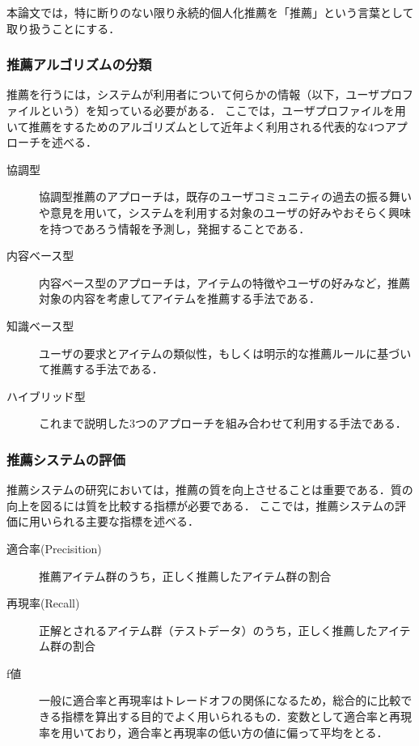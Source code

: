 \documentclass{jsarticle}
\begin{document}
本論文では，特に断りのない限り永続的個人化推薦を「推薦」という言葉として取り扱うことにする．

\subsubsection{推薦アルゴリズムの分類}

推薦を行うには，システムが利用者について何らかの情報（以下，ユーザプロファイルという）を知っている必要がある．
ここでは，ユーザプロファイルを用いて推薦をするためのアルゴリズムとして近年よく利用される代表的な4つアプローチを述べる．

\begin{description}
\item[協調型] 協調型推薦のアプローチは，既存のユーザコミュニティの過去の振る舞いや意見を用いて，システムを利用する対象のユーザの好みやおそらく興味を持つであろう情報を予測し，発掘することである．
\item[内容ベース型] 内容ベース型のアプローチは，アイテムの特徴やユーザの好みなど，推薦対象の内容を考慮してアイテムを推薦する手法である．
\item[知識ベース型] ユーザの要求とアイテムの類似性，もしくは明示的な推薦ルールに基づいて推薦する手法である．
\item[ハイブリッド型] これまで説明した3つのアプローチを組み合わせて利用する手法である．
\end{description}

\subsubsection{推薦システムの評価}

推薦システムの研究においては，推薦の質を向上させることは重要である．質の向上を図るには質を比較する指標が必要である．
ここでは，推薦システムの評価に用いられる主要な指標を述べる．

\begin{description}
\item[適合率(Precisition)] 推薦アイテム群のうち，正しく推薦したアイテム群の割合
\item[再現率(Recall)]  正解とされるアイテム群（テストデータ）のうち，正しく推薦したアイテム群の割合
\item[f値]  一般に適合率と再現率はトレードオフの関係になるため，総合的に比較できる指標を算出する目的でよく用いられるもの．変数として適合率と再現率を用いており，適合率と再現率の低い方の値に偏って平均をとる．
\end{description}
\end{document}
